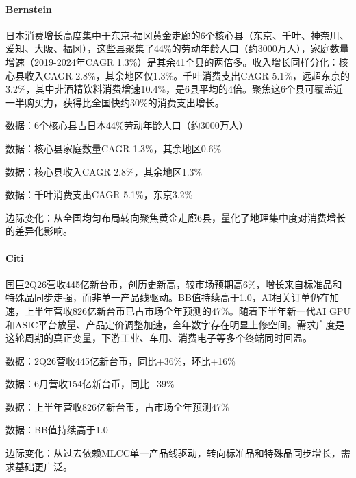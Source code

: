 \documentclass[11pt]{ctexart}
\begin{document}
\paragraph{Bernstein} 日本消费增长高度集中于东京-福冈黄金走廊的6个核心县（东京、千叶、神奈川、爱知、大阪、福冈），这些县聚集了44\%的劳动年龄人口（约3000万人），家庭数量增速（2019-2024年CAGR 1.3\%）是其余41个县的两倍多。收入增长同样分化：核心县收入CAGR 2.8\%，其余地区仅1.3\%。千叶消费支出CAGR 5.1\%，远超东京的3.2\%，其中非酒精饮料消费增速10.4\%，是6县平均的4倍。聚焦这6个县可覆盖近一半购买力，获得比全国快约30\%的消费支出增长。
{\small\color{refgray}数据：6个核心县占日本44\%劳动年龄人口（约3000万人）\par}
{\small\color{refgray}数据：核心县家庭数量CAGR 1.3\%，其余地区0.6\%\par}
{\small\color{refgray}数据：核心县收入CAGR 2.8\%，其余地区1.3\%\par}
{\small\color{refgray}数据：千叶消费支出CAGR 5.1\%，东京3.2\%\par}
{\small\color{refgray}边际变化：从全国均匀布局转向聚焦黄金走廊6县，量化了地理集中度对消费增长的差异化影响。\par}
\paragraph{Citi} 国巨2Q26营收445亿新台币，创历史新高，较市场预期高6\%，增长来自标准品和特殊品同步走强，而非单一产品线驱动。BB值持续高于1.0，AI相关订单仍在加速，上半年营收826亿新台币已占市场全年预测的47\%。随着下半年新一代AI GPU和ASIC平台放量、产品定价调整加速，全年数字存在明显上修空间。需求广度是这轮周期的真正变量，下游工业、车用、消费电子等多个终端同时回温。
{\small\color{refgray}数据：2Q26营收445亿新台币，同比+36\%，环比+16\%\par}
{\small\color{refgray}数据：6月营收154亿新台币，同比+39\%\par}
{\small\color{refgray}数据：上半年营收826亿新台币，占市场全年预测47\%\par}
{\small\color{refgray}数据：BB值持续高于1.0\par}
{\small\color{refgray}边际变化：从过去依赖MLCC单一产品线驱动，转向标准品和特殊品同步增长，需求基础更广泛。\par}
\end{document}
